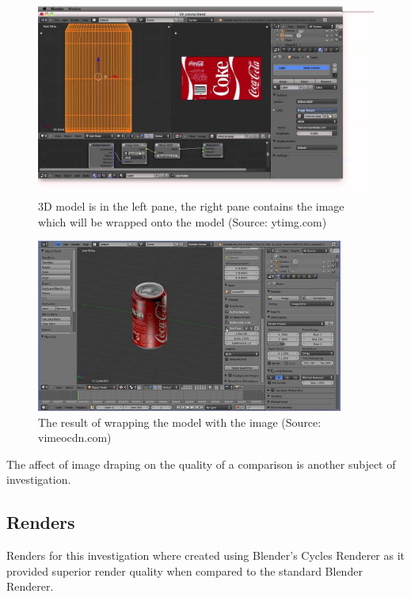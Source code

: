 \documentclass[11pt,a4paper]{report}
\begin{document}
				\begin{figure}[H]
					\centering
					\includegraphics[width=1\textwidth]{blender_uv_unwrap_1}
					\caption[UV unwrap]{3D model is in the left pane, the right pane contains the image which will be wrapped onto the model (Source: ytimg.com)}
					\label{fig:blender_uv_unwrap_1}
				\end{figure}
				
				\begin{figure}[H]
					\centering
					\includegraphics[width=0.9\textwidth]{blender_uv_unwrap_2}
					\caption[UV unwrap result]{The result of wrapping the model with the image (Source: vimeocdn.com)}
					\label{fig:blender_uv_unwrap_2}
				\end{figure}
				
				The affect of image draping on the quality of a comparison is another subject of investigation.
				
		\subsection{Renders}
			Renders for this investigation where created using Blender's Cycles Renderer as it provided superior render quality when compared to the standard Blender Renderer.
			
\end{document}
